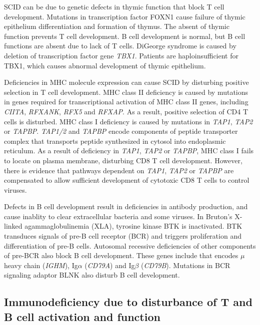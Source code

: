 \documentclass[11pt]{article}
\begin{document}
\begin{sloppypar}
\par

SCID can be due to genetic defects in thymic function that block T cell development. 
Mutations in transcription factor FOXN1 cause failure of thymic epithelium differentiation and formation of thymus. 
The absent of thymic function prevents T cell development. 
B cell development is normal, but B cell functions are absent due to lack of T cells. 
DiGeorge syndrome is caused by deletion of transcription factor gene \textit{TBX1}. 
Patients are haploinsufficient for TBX1, which causes abnormal development of thymic epithelium. 

\par

Deficiencies in MHC molecule expression can cause SCID by disturbing positive selection in T cell development. 
MHC class II deficiency is caused by mutations in genes required for transcriptional activation of MHC class II genes, including \textit{CIITA}, \textit{RFXANK}, \textit{RFX5} and \textit{RFXAP}. 
As a result, positive selection of CD4 T cells is disturbed. 
MHC class I deficiency is caused by mutations in \textit{TAP1}, \textit{TAP2} or \textit{TAPBP}. 
\textit{TAP1/2} and \textit{TAPBP} encode components of peptide transporter complex that transports peptide synthesized in cytosol into endoplasmic reticulum. 
As a result of deficiency in \textit{TAP1}, \textit{TAP2} or \textit{TAPBP}, MHC class I fails to locate on plasma membrane, disturbing CD8 T cell development. 
However, there is evidence that pathways dependent on \textit{TAP1}, \textit{TAP2} or \textit{TAPBP} are compensated to allow sufficient development of cytotoxic CD8 T cells to control viruses. 

\par

Defects in B cell development result in deficiencies in antibody production, and cause inablity to clear extracellular bacteria and some viruses. 
In Bruton's X-linked agammaglobulinemia (XLA), tyrosine kinase BTK is inactivated. 
BTK transduces signals of pre-B cell receptor (BCR) and triggers proliferation and differentiation of pre-B cells. 
Autosomal recessive deficiencies of other components of pre-BCR also block B cell development. 
These genes include that encodes $\mu$ heavy chain (\textit{IGHM}), Ig$\alpha$ (\textit{CD79A}) and Ig$\beta$ (\textit{CD79B}). 
Mutations in BCR signaling adaptor BLNK also disturb B cell development. 

\subsection{Immunodeficiency due to disturbance of T and B cell activation and function}


\end{sloppypar}
\end{document}
